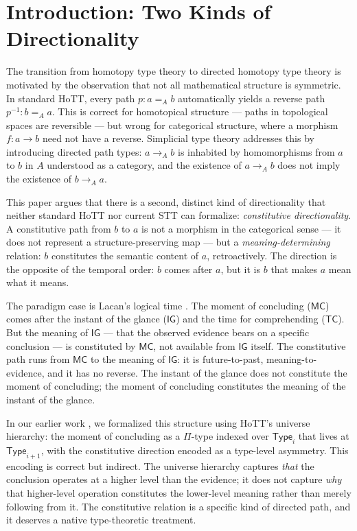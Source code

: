 \documentclass[12pt]{article}
\theoremstyle{definition}
\theoremstyle{remark}
\newcommand{\Type}[1]{\mathsf{Type}_{#1}}
\newcommand{\MC}{\mathsf{MC}}
\newcommand{\TC}{\mathsf{TC}}
\newcommand{\IG}{\mathsf{IG}}
\begin{document}
\vspace{1em}

\section{Introduction: Two Kinds of Directionality}

The transition from homotopy type theory to directed homotopy type theory is motivated by the observation that not all mathematical structure is symmetric. In standard HoTT, every path $p : a =_A b$ automatically yields a reverse path $p^{-1} : b =_A a$. This is correct for homotopical structure --- paths in topological spaces are reversible --- but wrong for categorical structure, where a morphism $f : a \to b$ need not have a reverse. Simplicial type theory addresses this by introducing directed path types: $a \to_A b$ is inhabited by homomorphisms from $a$ to $b$ in $A$ understood as a category, and the existence of $a \to_A b$ does not imply the existence of $b \to_A a$.

This paper argues that there is a second, distinct kind of directionality that neither standard HoTT nor current STT can formalize: \textit{constitutive directionality}. A constitutive path from $b$ to $a$ is not a morphism in the categorical sense --- it does not represent a structure-preserving map --- but a \textit{meaning-determining} relation: $b$ constitutes the semantic content of $a$, retroactively. The direction is the opposite of the temporal order: $b$ comes after $a$, but it is $b$ that makes $a$ mean what it means.

The paradigm case is Lacan's logical time \cite{lacan1945}. The moment of concluding ($\MC$) comes after the instant of the glance ($\IG$) and the time for comprehending ($\TC$). But the meaning of $\IG$ --- that the observed evidence bears on a specific conclusion --- is constituted by $\MC$, not available from $\IG$ itself. The constitutive path runs from $\MC$ to the meaning of $\IG$: it is future-to-past, meaning-to-evidence, and it has no reverse. The instant of the glance does not constitute the moment of concluding; the moment of concluding constitutes the meaning of the instant of the glance.

In our earlier work \cite{papathanasiou2026d}, we formalized this structure using HoTT's universe hierarchy: the moment of concluding as a $\Pi$-type indexed over $\Type{i}$ that lives at $\Type{i+1}$, with the constitutive direction encoded as a type-level asymmetry. This encoding is correct but indirect. The universe hierarchy captures \textit{that} the conclusion operates at a higher level than the evidence; it does not capture \textit{why} that higher-level operation constitutes the lower-level meaning rather than merely following from it. The constitutive relation is a specific kind of directed path, and it deserves a native type-theoretic treatment.
\end{document}
